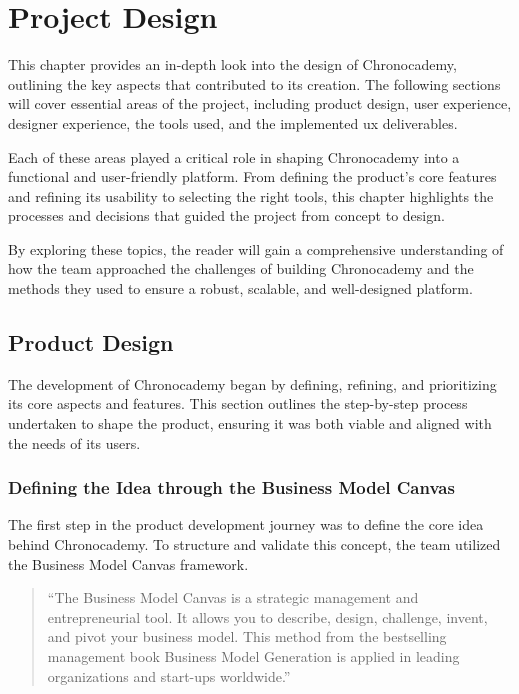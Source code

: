 \chapter{Project Design}\label{ch:project-design}

This chapter provides an in-depth look into the design of Chronocademy, outlining the key aspects that contributed to its creation.
The following sections will cover essential areas of the project, including product design, user experience, designer experience, the tools used, and the implemented ux deliverables.

Each of these areas played a critical role in shaping Chronocademy into a functional and user-friendly platform.
From defining the product's core features and refining its usability to selecting the right tools, this chapter highlights the processes and decisions that guided the project from concept to design.

By exploring these topics, the reader will gain a comprehensive understanding of how the team approached the challenges of building Chronocademy and the methods they used to ensure a robust, scalable, and well-designed platform.


\section{Product Design}\label{sec:product-design}
The development of Chronocademy began by defining, refining, and prioritizing its core aspects and features.
This section outlines the step-by-step process undertaken to shape the product, ensuring it was both viable and aligned with the needs of its users.

\subsection{Defining the Idea through the Business Model Canvas}\label{subsec:business-model-canvas}
The first step in the product development journey was to define the core idea behind Chronocademy.
To structure and validate this concept, the team utilized the Business Model Canvas framework.

\begin{quote}
    ``The Business Model Canvas is a strategic management and entrepreneurial tool.
    It allows you to describe, design, challenge, invent, and pivot your business model.
    This method from the bestselling management book Business Model Generation is applied in leading organizations and start-ups worldwide.''
    \cite[Business Canvas Model]{business-canvas-model}
\end{quote}

